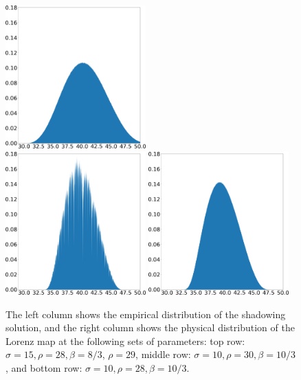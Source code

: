 \begin{figure}
    \hspace{0.005\textwidth}
    \includegraphics[width=0.48\textwidth]{baseline_density_lorenz_zmax_10_30_2.67.json.png}
    \\
    \includegraphics[width=0.48\textwidth]{lorenz_shadow_density_lorenz_zmax_10_28_3.33.json.png}
    \hspace{0.005\textwidth}
    \includegraphics[width=0.48\textwidth]{baseline_density_lorenz_zmax_10_28_3.33.json.png}
    \caption{The left column shows the empirical distribution of the shadowing solution, and the right column shows the physical distribution of the Lorenz map at the following sets of parameters: top row: $\sigma = 15, \rho = 28, \beta = 8/3$, $\rho = 29$, middle row: $\sigma = 10, \rho = 30, \beta = 10/3$, and bottom row: $\sigma = 10, \rho = 28, \beta = 10/3$.
    }
    \label{fig:lorenz_params_scaled}
\end{figure}
